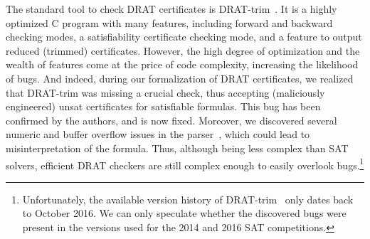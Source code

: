 \documentclass[smallcondensed]{svjour3}     %
\begin{document}

The standard tool to check DRAT certificates is DRAT-trim~\cite{WHH14,drat-trim-webpage}. 
It is a highly optimized C program with many features, including forward and backward checking modes, a satisfiability certificate checking mode,
and a feature to output reduced (trimmed) certificates.
% 
% 
However, the high degree of optimization and the wealth of features come at the price of code complexity, increasing the likelihood of bugs. And indeed, 
during our formalization of DRAT certificates, we realized that DRAT-trim was missing a crucial check, thus accepting (maliciously engineered) unsat certificates 
for satisfiable formulas. This bug has been confirmed by the authors, and is now fixed.
Moreover, we discovered several numeric and buffer overflow issues in the parser~\cite{drat-trim-issues}, which could lead to misinterpretation of the formula.
Thus, although being less complex than SAT solvers, efficient DRAT checkers are still complex enough to easily overlook bugs.\footnote{Unfortunately, the available version history of DRAT-trim~\cite{drat-trim-github} only dates back to October 2016. We can only speculate whether the discovered bugs were present in the versions used for the 2014 and 2016 SAT competitions.} 
\end{document}
